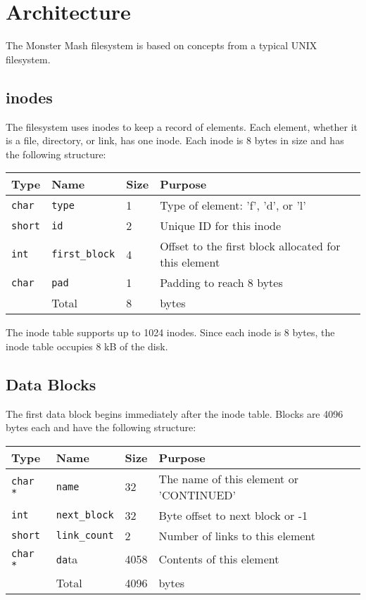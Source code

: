 \documentclass[]{article}
\begin{document}
\section{Architecture}
The Monster Mash filesystem is based on concepts from a typical UNIX filesystem.

\subsection{inodes}
The filesystem uses inodes to keep a record of elements. Each element, whether it is a file, directory, or link, has one inode. Each inode is 8 bytes in size and has the following structure:

\begin{table}[h]
	\begin{tabular}{llll}
		Type  & Name         & Size & Purpose                                              \\ \hline
		\texttt{char}  & \texttt{type}         & 1    & Type of element: 'f', 'd', or 'l'                    \\
		\texttt{short} & \texttt{id}           & 2    & Unique ID for this inode                             \\
		\texttt{int}   & \texttt{first\_block} & 4    & Offset to the first block allocated for this element \\
		\texttt{char}  & \texttt{pad}          & 1    & Padding to reach 8 bytes                             \\ \hline
		\space		   & Total                 & 8    & bytes
	\end{tabular}
\end{table}

The inode table supports up to 1024 inodes. Since each inode is 8 bytes, the inode table occupies 8 kB of the disk.

\subsection{Data Blocks}
The first data block begins immediately after the inode table. Blocks are 4096 bytes each and have the following structure:

\begin{table}[h]
	\begin{tabular}{llll}
		Type   & Name        & Size & Purpose                                 \\ \hline
		\texttt{char *} & \texttt{name}        & 32   & The name of this element or 'CONTINUED' \\
		\texttt{int}    & \texttt{next\_block} & 32   & Byte offset to next block or -1         \\
		\texttt{short}  & \texttt{link\_count} & 2    & Number of links to this element         \\
		\texttt{char *} & \texttt{da}ta        & 4058 & Contents of this element                \\ \hline
		\space		    & Total                & 4096 & bytes
	\end{tabular}
\end{table}
\end{document}

